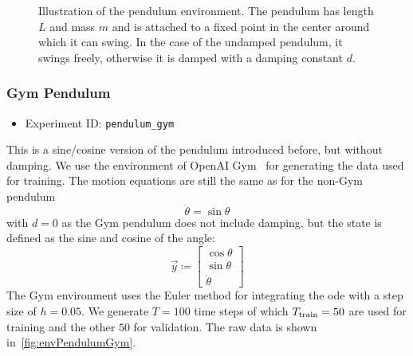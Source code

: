 			\begin{figure}
				\centering
				\tikzSimplePendulum
				\caption[Illustration of the pendulum environment]{Illustration of the pendulum environment. The pendulum has length \(L\) and mass \(m\) and is attached to a fixed point in the center around which it can swing. In the case of the undamped pendulum, it swings freely, otherwise it is damped with a damping constant \(d\).}
				\label{fig:envPendulumSketch}
			\end{figure}

		\subsubsection{Gym Pendulum}
			\begin{itemize}
				\item Experiment ID: \texttt{pendulum\_gym}
			\end{itemize}

			This is a sine/cosine version of the pendulum introduced before, but without damping. We use the environment of OpenAI Gym~\cite{brockmanOpenAIGym2016} for generating the data used for training. The motion equations are still the same as for the non-Gym pendulum
			\begin{equation*}
				\ddot{\theta} = \sin\theta
			\end{equation*}
			with \( d = 0 \) as the Gym pendulum does not include damping, but the state is defined as the sine and cosine of the angle:
			\begin{equation*}
				\vec{y} \coloneqq
					\begin{bmatrix}
						\cos\theta \\
						\sin\theta \\
						\dot{\theta}
					\end{bmatrix}
			\end{equation*}
			The Gym environment uses the Euler method for integrating the \ac{ode} with a step size of \( h = 0.05 \). We generate \( T = 100 \) time steps of which \( T_{\mathrm{train}} = 50 \) are used for training and the other \(50\) for validation. The raw data is shown in~\autoref{fig:envPendulumGym}.

